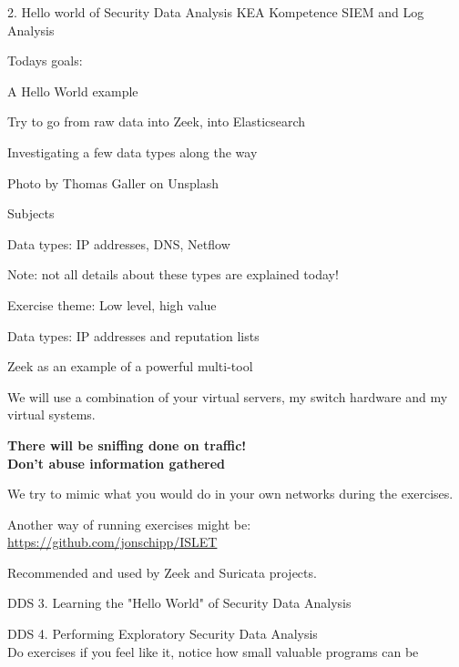 \documentclass[Screen16to9,17pt]{foils}
\begin{document}
\mytitlepage
{2. Hello world of Security Data Analysis}
{KEA Kompetence SIEM and Log Analysis}



Todays goals:
\begin{list2}
\item A Hello World example
\item Try to go from raw data into Zeek, into Elasticsearch
\item Investigating a few data types along the way
\end{list2}

Photo by Thomas Galler on Unsplash





\begin{list1}
\item Subjects
\begin{list2}
\item Data types: IP addresses, DNS, Netflow
\item Note: not all details about these types are explained today!
\end{list2}
\item Exercise theme: Low level, high value
\begin{list2}
\item Data types: IP addresses and reputation lists
\item Zeek as an example of a powerful multi-tool
\end{list2}
\end{list1}



We will use a combination of your virtual servers, my switch hardware and my virtual systems.

\vskip 1cm
{\Large \bf There will be sniffing done on traffic!\\
Don't abuse information gathered}

We try to mimic what you would do in your own networks during the exercises.

Another way of running exercises might be:\\
\url{https://github.com/jonschipp/ISLET}

Recommended and used by Zeek and Suricata projects.



\begin{list1}
\item DDS 3. Learning the "Hello World" of Security Data Analysis
\item DDS 4. Performing Exploratory Security Data Analysis \\
Do exercises if you feel like it, notice how small valuable programs can be
\end{list1}
\end{document}
